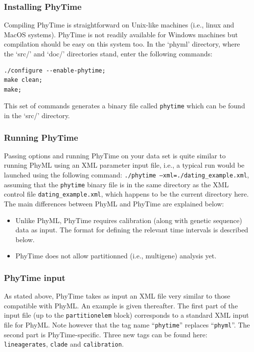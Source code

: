 \documentclass[a4paper,12pt]{article}
\newcommand{\x}[1]{\texttt{#1}}
\begin{document}
\subsubsection{Installing PhyTime}

Compiling PhyTime is straightforward on Unix-like  machines (i.e., linux and MacOS systems). PhyTime
is not readily available for Windows machines but  compilation should be easy on this system too. In
the `phyml' directory, where the `src/'  and `doc/' directories stand, enter the following commands:
{\setlength{\baselineskip}{0.5\baselineskip}
\begin{verbatim}
./configure --enable-phytime;
make clean;
make;
\end{verbatim} } This set of commands generates  a binary file called \x{phytime} which can be found
  in the `src/' directory.

\subsubsection{Running  PhyTime} Passing  options and  running  PhyTime on  your data  set is  quite
similar to running  PhyML using an XML parameter input file, i.e., a typical run would be launched
using the following command: \x{./phytime --xml=./dating\_example.xml}, assuming that the \x{phytime} binary file is in the same
directory as the XML control file \x{dating\_example.xml}, which happens to be the current directory here. The main
differences between PhyML and PhyTime are explained below:
\begin{itemize}
\item Unlike PhyML, PhyTime requires calibration (along with genetic sequence) data as input. The format for
  defining the relevant time intervals is described below.
\item  PhyTime does not allow partitionned (i.e., multigene) analysis yet.
\end{itemize}

\subsubsection{PhyTime input}
As stated above, PhyTime takes as input an XML file very similar to those compatible with PhyML. An
example is given thereafter. The first part of the input file (up to the \x{partitionelem} block) corresponds to a standard XML input
file for PhyML. Note however that the tag name ``\x{phytime}'' replaces ``\x{phyml}''. The second
part is PhyTime-specific. Three new tags can be found here: \x{lineagerates}, \x{clade}
and \x{calibration}. 
\end{document}
